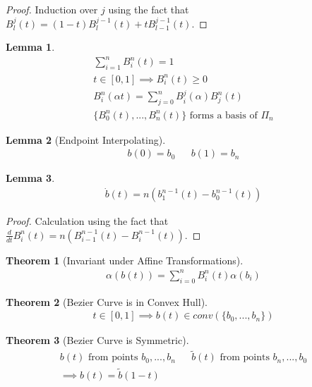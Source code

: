 \documentclass[conference]{IEEEtran}
\newtheorem{lemma}{Lemma}
\newtheorem{theorem}{Theorem}
\begin{document}
\begin{proof}
	Induction over $j$ using the fact that\\
	$B_l^j(t) = (1-t)B_l^{j-1}(t) + t B_{l-1}^{j-1}(t)$.
\end{proof}

\begin{lemma}
	\begin{align*}
		\sum_{i=1}^{n} B_i^n(t) = 1\\
		t \in [0, 1] \implies B_i^n(t) \geq 0\\
		B_i^n(\alpha t) = \sum_{j=0}^{n} B_i^j(\alpha) B_j^n(t)\\
		\{B_0^n(t), ..., B_n^n(t)\} \text{ forms a basis of } \Pi_n
	\end{align*}
\end{lemma}


\begin{lemma}[Endpoint Interpolating]
	\begin{align*}
		b(0) = b_0 && b(1) = b_n
	\end{align*}
\end{lemma}

\begin{lemma}
	\begin{align*}
		\dot{b}(t) = n(b_1^{n-1}(t) - b_0^{n-1}(t))
	\end{align*}
\end{lemma}

\begin{proof}
	Calculation using the fact that\\
	$\frac{d}{dt} B_i^n(t) = n (B_{i-1}^{n-1}(t) - B_i^{n-1}(t))$.
\end{proof}

\begin{theorem}[Invariant under Affine Transformations]
	\begin{align*}
		\alpha(b(t)) = \sum_{i=0}^{n} B_i^n(t) \alpha(b_i)
	\end{align*}
\end{theorem}

\begin{theorem}[Bezier Curve is in Convex Hull]
	\begin{align*}
		t \in [0, 1] \implies b(t) \in conv(\{b_0, ..., b_n\})
	\end{align*}
\end{theorem}

\begin{theorem}[Bezier Curve is Symmetric]
	\begin{align*}
		b(t) \text{ from points } b_0, ..., b_n && \tilde{b}(t) \text{ from points } b_n, ..., b_0\\
		\implies b(t) = \tilde{b}(1-t)
	\end{align*}
\end{theorem}
\end{document}
